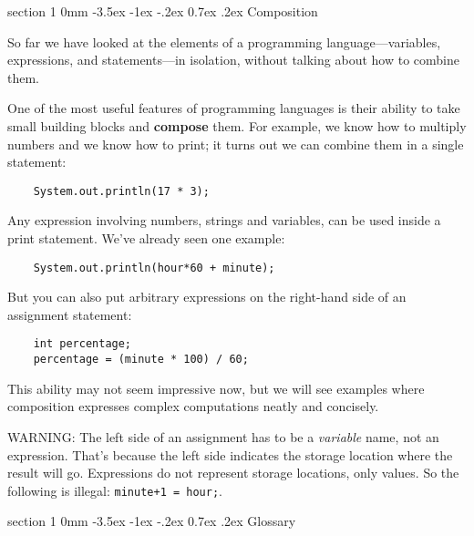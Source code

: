 \documentclass{book}
\makeatletter
\renewcommand{\section}{\@startsection 
    {section} {1} {0mm}%
    {-3.5ex \@plus -1ex \@minus -.2ex}%
    {0.7ex \@plus.2ex}%
    {\normalfont\Large\bfseries}}
\makeatother
\begin{document}
\section{Composition}

So far we have looked at the elements of a programming
language---variables, expressions, and statements---in
isolation, without talking about how to combine them.

One of the most useful features of programming languages
is their ability to take small building blocks and
{\bf compose} them.  For example, we know how to multiply
numbers and we know how to print; it turns out we can
combine them in a single statement:

\begin{verbatim}
    System.out.println(17 * 3);
\end{verbatim}
%
Any expression involving numbers, strings
and variables, can be used inside a print statement.  We've
already seen one example:

\begin{verbatim}
    System.out.println(hour*60 + minute);
\end{verbatim}
%
But you can also put arbitrary expressions on the right-hand
side of an assignment statement:

\begin{verbatim}
    int percentage;
    percentage = (minute * 100) / 60;
\end{verbatim}
%
This ability may not seem impressive now, but we will see
examples where composition 
expresses complex computations neatly and concisely.

WARNING: The left side of an assignment
has to be a {\em variable} name, not an expression.
That's because the left side indicates the storage location
where the result will go.  Expressions
do not represent storage locations, only values.  So the
following is illegal:  {\tt minute+1 = hour;}.

\section{Glossary}
\end{document}
